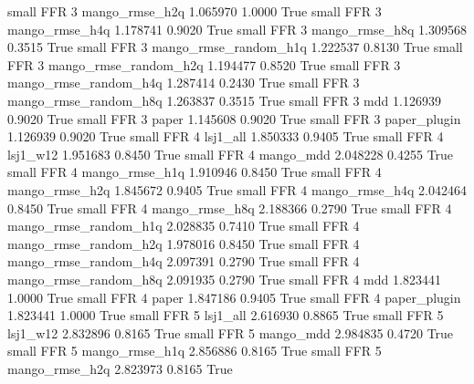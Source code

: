      small      FFR                 3        mango_rmse_h2q   1.065970      1.0000    True
     small      FFR                 3        mango_rmse_h4q   1.178741      0.9020    True
     small      FFR                 3        mango_rmse_h8q   1.309568      0.3515    True
     small      FFR                 3 mango_rmse_random_h1q   1.222537      0.8130    True
     small      FFR                 3 mango_rmse_random_h2q   1.194477      0.8520    True
     small      FFR                 3 mango_rmse_random_h4q   1.287414      0.2430    True
     small      FFR                 3 mango_rmse_random_h8q   1.263837      0.3515    True
     small      FFR                 3                   mdd   1.126939      0.9020    True
     small      FFR                 3                 paper   1.145608      0.9020    True
     small      FFR                 3          paper_plugin   1.126939      0.9020    True
     small      FFR                 4              lsj1_all   1.850333      0.9405    True
     small      FFR                 4              lsj1_w12   1.951683      0.8450    True
     small      FFR                 4             mango_mdd   2.048228      0.4255    True
     small      FFR                 4        mango_rmse_h1q   1.910946      0.8450    True
     small      FFR                 4        mango_rmse_h2q   1.845672      0.9405    True
     small      FFR                 4        mango_rmse_h4q   2.042464      0.8450    True
     small      FFR                 4        mango_rmse_h8q   2.188366      0.2790    True
     small      FFR                 4 mango_rmse_random_h1q   2.028835      0.7410    True
     small      FFR                 4 mango_rmse_random_h2q   1.978016      0.8450    True
     small      FFR                 4 mango_rmse_random_h4q   2.097391      0.2790    True
     small      FFR                 4 mango_rmse_random_h8q   2.091935      0.2790    True
     small      FFR                 4                   mdd   1.823441      1.0000    True
     small      FFR                 4                 paper   1.847186      0.9405    True
     small      FFR                 4          paper_plugin   1.823441      1.0000    True
     small      FFR                 5              lsj1_all   2.616930      0.8865    True
     small      FFR                 5              lsj1_w12   2.832896      0.8165    True
     small      FFR                 5             mango_mdd   2.984835      0.4720    True
     small      FFR                 5        mango_rmse_h1q   2.856886      0.8165    True
     small      FFR                 5        mango_rmse_h2q   2.823973      0.8165    True

